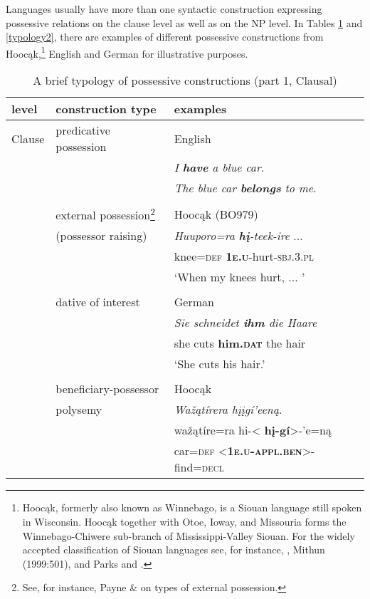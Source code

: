 \documentclass[output=paper]{LSP/langsci}
\begin{document}
Languages usually have more than one syntactic construction expressing possessive relations on the clause level as well as on the NP level. In Tables \ref{typology1} and \ref{typology2}, there are examples of different possessive constructions from Hooc\k{a}k,\footnote{Hooc\k{a}k, formerly also known as Winnebago, is a Siouan language still spoken in Wisconsin. Hooc\k{a}k together with Otoe, Ioway, and Missouria forms the Winnebago-Chiwere sub-branch of Mississippi-Valley Siouan. For the widely accepted classification of Siouan languages see, for instance, \citet{Rood1979}, Mithun (1999:501), and Parks and \citet{Rankin2001}.} English and German for illustrative purposes.

\begin{table}
\caption{A brief typology of possessive constructions (part 1, Clausal)} \label{typology1}
\begin{tabular}[h!]{l l l }
\lsptoprule
level & construction type & examples \\
\midrule
Clause& predicative possession 	& English \\ 
& & \textit{I \textbf{have} a blue car}. \\
 & & \textit{The blue car \textbf{belongs} to me}. \\
 & \\
& external possession\footnote{See, for instance, Payne \& \citet{Barshi1999} on types of external possession.} & Hooc\k{a}k (BO979)\\     
& (possessor raising) & \textit{Huuporo=ra \textbf{h\k{i}}-teek-ire} ... \\ 
& & knee=\textsc{def}   \textbf{\textsc{1e.u}}-hurt-\textsc{sbj.3.pl} \\
& & `When my knees hurt, ... ' \\
& \\
& dative of interest & German \\
& & \textit{Sie schneidet \textbf{ihm}           die Haare} \\
& & she cuts         \textbf{him.\textsc{dat}} the hair \\
& & `She cuts his hair.' \\
& \\
&beneficiary-possessor & Hooc\k{a}k \citep[28]{Helmbrecht2003} \\
& polysemy  & \textit{Waž\k{a}tírera hįįgí'een\k{a}}.\\
& & waž\k{a}tíre=ra    hi-< \textbf{hį-gí}>-'e=n\k{a} \\
& & car=\textsc{def}  <\textbf{\textsc{1e.u-appl.ben}}>-find=\textsc{decl} \\

\end{tabular}
\end{table}
\end{document}
